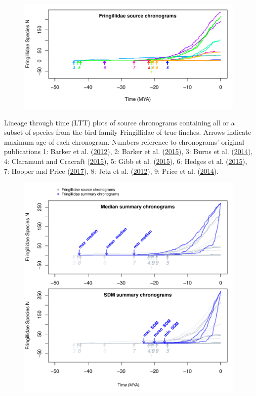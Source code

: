 \documentclass[]{article}
\begin{document}
\newpage
\begin{figure}[!h]
\includegraphics[width=1\linewidth]{./figures/fig_schronograms1.pdf}
\caption{}
\label{fig:schronograms1}
\end{figure}
Lineage through time (LTT) plots of source chronograms containing all or a subset of species from the bird family Fringillidae of true finches. Arrows indicate maximum age of each chronogram. Numbers reference to chronograms' original publications 1: Barker et al. (\protect\hyperlink{ref-barker2012going}{2012}), 2: Barker et al. (\protect\hyperlink{ref-barker2015new}{2015}), 3: Burns et al. (\protect\hyperlink{ref-burns2014phylogenetics}{2014}), 4: Claramunt and Cracraft (\protect\hyperlink{ref-claramunt2015new}{2015}), 5: Gibb et al. (\protect\hyperlink{ref-gibb2015new}{2015}), 6: Hedges et al. (\protect\hyperlink{ref-Hedges2015}{2015}), 7: Hooper and Price (\protect\hyperlink{ref-hooper2017chromosomal}{2017}), 8: Jetz et al. (\protect\hyperlink{ref-Jetz2012}{2012}), 9: Price et al. (\protect\hyperlink{ref-price2014niche}{2014}).
\newpage
\begin{figure}[!h]
\includegraphics{./figures/fig_summaries.pdf}
\caption{}
\label{fig:summaries}
\end{figure}
\end{document}
